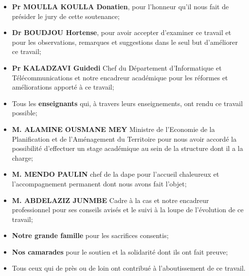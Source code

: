 \documentclass[12pt, a4paper, oneside]{report}
\begin{document}
	\begin{itemize}
		\item \textbf{Pr MOULLA KOULLA Donatien}, pour l'honneur qu'il nous fait de présider le jury de cette soutenance;
		\item \textbf{Dr BOUDJOU Hortense}, pour avoir accepter d'examiner ce travail et pour les observations, remarques et suggestions dans le seul but d'améliorer ce travail; 
		\item \textbf{Pr KALADZAVI Guidedi}  Chef du Département d'Informatique et Télécommunications et notre encadreur académique pour les réformes et améliorations apporté à ce travail;
		\item Tous les \textbf{enseignants} qui, à travers leurs enseignements, ont rendu ce travail possible;
		\item \textbf{M. ALAMINE OUSMANE MEY} Ministre de l'Economie de la Planification et de l'Aménagement du Territoire pour nous avoir accordé la possibilité d'effectuer un stage académique au sein de la structure dont il a la charge;
		\item \textbf{M. MENDO PAULIN} chef de la \gls{dape} pour l'accueil chaleureux et l'accompagnement permanent dont nous avons fait l'objet;
		\item \textbf{M. ABDELAZIZ JUNMBE} Cadre à la \gls{cas} et notre encadreur professionnel pour ses conseils avisés et le suivi à la loupe de l'évolution de ce travail;
		\item  \textbf{Notre grande famille} pour les sacrifices consentis;
		\item \textbf{Nos camarades} pour le soutien et la solidarité dont ils ont fait preuve;
		\item Tous ceux qui de près ou de loin ont contribué à l'aboutissement de ce travail.
	\end{itemize}
	
	\tableofcontents
	
\printglossary[type=\acronymtype, title={Liste des abréviations}]

\end{document}
